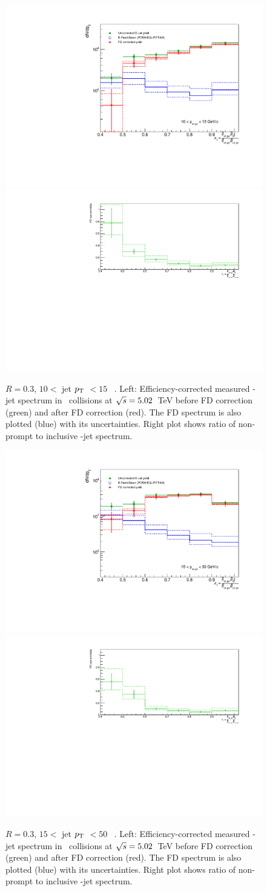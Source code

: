 \begin{figure}[bth]
\centering
\includegraphics[width=.47\textwidth]{pp_2sig/FD/R3/10_15/JetPtSpectra_FDsub}
\includegraphics[width=.522\textwidth]{pp_2sig/FD/R3/10_15/FDratio}
\caption{$R=0.3$, $10<$ jet $p_{\text T}$ $< 15$ \GeVc\ . Left: Efficiency-corrected measured \Dzero-jet spectrum in \pp\ collisions at $\sqrt{s}=5.02$~TeV before FD correction (green) and after FD correction (red). The FD spectrum is also plotted (blue) with its uncertainties. Right plot shows ratio of non-prompt to inclusive \Dzero-jet spectrum.}
\label{fig:ppFD_corr_Dzero_z10_15_R3}
\end{figure}

\begin{figure}[bth]
\centering
\includegraphics[width=.47\textwidth]{pp_2sig/FD/R3/15_50/JetPtSpectra_FDsub}
\includegraphics[width=.522\textwidth]{pp_2sig/FD/R3/15_50/FDratio}
\caption{$R=0.3$, $15<$ jet $p_{\text T}$ $<50$ \GeVc\ . Left: Efficiency-corrected measured \Dzero-jet spectrum in \pp\ collisions at $\sqrt{s}=5.02$~TeV before FD correction (green) and after FD correction (red). The FD spectrum is also plotted (blue) with its uncertainties. Right plot shows ratio of non-prompt to inclusive \Dzero-jet spectrum.}
\label{fig:ppFD_corr_Dzero_z15_50_R3}
\end{figure}

